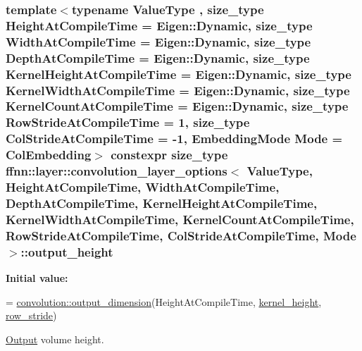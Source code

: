 \hypertarget{structffnn_1_1layer_1_1convolution__layer__options_a8d7e31a6469ef53b7aa9673722d405b1}{
\subsubsection[{output\-\_\-height}]{\setlength{\rightskip}{0pt plus 5cm}template$<$typename Value\-Type , size\-\_\-type Height\-At\-Compile\-Time = Eigen\-::\-Dynamic, size\-\_\-type Width\-At\-Compile\-Time = Eigen\-::\-Dynamic, size\-\_\-type Depth\-At\-Compile\-Time = Eigen\-::\-Dynamic, size\-\_\-type Kernel\-Height\-At\-Compile\-Time = Eigen\-::\-Dynamic, size\-\_\-type Kernel\-Width\-At\-Compile\-Time = Eigen\-::\-Dynamic, size\-\_\-type Kernel\-Count\-At\-Compile\-Time = Eigen\-::\-Dynamic, size\-\_\-type Row\-Stride\-At\-Compile\-Time = 1, size\-\_\-type Col\-Stride\-At\-Compile\-Time = -\/1, Embedding\-Mode Mode = Col\-Embedding$>$ constexpr {\bf size\-\_\-type} {\bf ffnn\-::layer\-::convolution\-\_\-layer\-\_\-options}$<$ Value\-Type, Height\-At\-Compile\-Time, Width\-At\-Compile\-Time, Depth\-At\-Compile\-Time, Kernel\-Height\-At\-Compile\-Time, Kernel\-Width\-At\-Compile\-Time, Kernel\-Count\-At\-Compile\-Time, Row\-Stride\-At\-Compile\-Time, Col\-Stride\-At\-Compile\-Time, Mode $>$\-::output\-\_\-height\hspace{0.3cm}{\ttfamily [static]}}}\label{structffnn_1_1layer_1_1convolution__layer__options_a8d7e31a6469ef53b7aa9673722d405b1}
{\bfseries Initial value\-:}
\begin{DoxyCode}
=
    \hyperlink{namespaceffnn_1_1layer_1_1convolution_aca263840b789df041d868a8a87dbf36a}{convolution::output\_dimension}(HeightAtCompileTime, 
      \hyperlink{structffnn_1_1layer_1_1convolution__layer__options_adfab0e8e8f7e9537dc60a0e56e311161}{kernel\_height}, \hyperlink{structffnn_1_1layer_1_1convolution__layer__options_a6a12ff75eaa8b67b66396b90804e8187}{row\_stride})
\end{DoxyCode}


\hyperlink{classffnn_1_1layer_1_1_output}{Output} volume height. 

